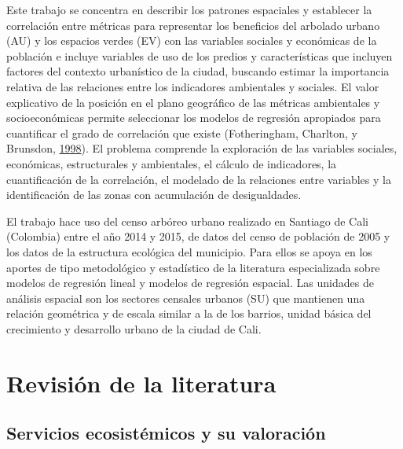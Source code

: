 \documentclass[12pt,a4paper,openany]{book}
\theoremstyle{definition}
\theoremstyle{definition}
\theoremstyle{definition}
\theoremstyle{remark}
\begin{document}
Este trabajo se concentra en describir los patrones espaciales y
establecer la correlación entre métricas para representar los beneficios
del arbolado urbano (AU) y los espacios verdes (EV) con las variables
sociales y económicas de la población e incluye variables de uso de los
predios y características que incluyen factores del contexto urbanístico
de la ciudad, buscando estimar la importancia relativa de las relaciones
entre los indicadores ambientales y sociales. El valor explicativo de la
posición en el plano geográfico de las métricas ambientales y
socioeconómicas permite seleccionar los modelos de regresión apropiados
para cuantificar el grado de correlación que existe (Fotheringham,
Charlton, y Brunsdon,
\protect\hyperlink{ref-fotheringham_geographically_1998}{1998}). El
problema comprende la exploración de las variables sociales, económicas,
estructurales y ambientales, el cálculo de indicadores, la
cuantificación de la correlación, el modelado de la relaciones entre
variables y la identificación de las zonas con acumulación de
desigualdades.

El trabajo hace uso del censo arbóreo urbano realizado en Santiago de
Cali (Colombia) entre el año 2014 y 2015, de datos del censo de
población de 2005 y los datos de la estructura ecológica del municipio.
Para ellos se apoya en los aportes de tipo metodológico y estadístico de
la literatura especializada sobre modelos de regresión lineal y modelos
de regresión espacial. Las unidades de análisis espacial son los
sectores censales urbanos (SU) que mantienen una relación geométrica y
de escala similar a la de los barrios, unidad básica del crecimiento y
desarrollo urbano de la ciudad de Cali.

\chapter{Revisión de la literatura}\label{revlit}

\section{Servicios ecosistémicos y su
valoración}\label{servicios-ecosistuxe9micos-y-su-valoraciuxf3n}
\end{document}
